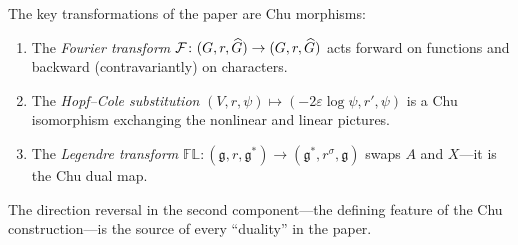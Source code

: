\begin{remark}
The key transformations of the paper are Chu morphisms:
\begin{enumerate}[label=(\alph*),nosep]
\item The \emph{Fourier transform}
  $\mathcal{F} \colon (G, r, \widehat{G}) \to (G, r, \widehat{G})$ acts
  forward on functions and backward (contravariantly) on characters.
\item The \emph{Hopf--Cole substitution}
  $(V, r, \psi) \mapsto (-2\varepsilon\log\psi, r', \psi)$ is a
  Chu isomorphism exchanging the nonlinear and linear pictures.
\item The \emph{Legendre transform}
  $\mathbb{FL} \colon (\mathfrak{g}, r, \mathfrak{g}^*) \to
  (\mathfrak{g}^*, r^\sigma, \mathfrak{g})$
  swaps $A$ and $X$---it is the Chu dual map.
\end{enumerate}
The direction reversal in the second component---the defining feature
of the Chu construction---is the source of every ``duality'' in the
paper.
\end{remark}

